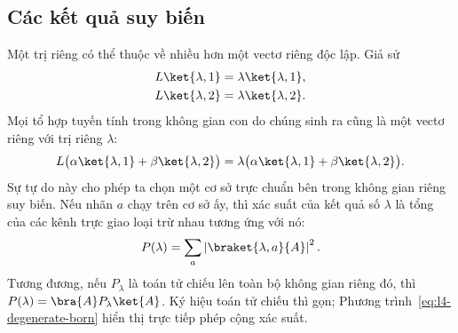\begin{classroomqa}
\end{classroomqa}

\begin{classroomqa}
\end{classroomqa}

\subsection{Các kết quả suy biến}

Một trị riêng có thể thuộc về nhiều hơn một vectơ riêng độc lập. Giả sử
\begin{align}
L\ket{\lambda,1}&=\lambda\ket{\lambda,1},\\
L\ket{\lambda,2}&=\lambda\ket{\lambda,2}.
\end{align}
Mọi tổ hợp tuyến tính trong không gian con do chúng sinh ra cũng là một vectơ riêng với trị riêng \(\lambda\):
\begin{equation}
L\bigl(\alpha\ket{\lambda,1}+\beta\ket{\lambda,2}\bigr)
=
\lambda\bigl(\alpha\ket{\lambda,1}+\beta\ket{\lambda,2}\bigr).
\end{equation}
Sự tự do này cho phép ta chọn một cơ sở trực chuẩn bên trong không gian riêng suy biến. Nếu nhãn \(a\) chạy trên cơ sở ấy, thì xác suất của kết quả số \(\lambda\) là tổng của các kênh trực giao loại trừ nhau tương ứng với nó:
\begin{equation}
P(\lambda)=\sum_a\left|\braket{\lambda,a}{A}\right|^2.
\label{eq:l4-degenerate-born}
\end{equation}
Tương đương, nếu \(P_\lambda\) là toán tử chiếu lên toàn bộ không gian riêng đó, thì \(P(\lambda)=\bra{A}P_\lambda\ket{A}\). Ký hiệu toán tử chiếu thì gọn; Phương trình~\eqref{eq:l4-degenerate-born} hiển thị trực tiếp phép cộng xác suất.

